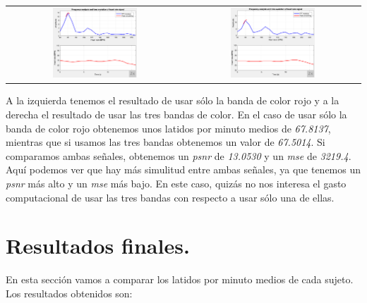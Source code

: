 \documentclass[11pt]{article}
\begin{document}
\begin{table}[H]
	\centering
	\begin{tabular}{cc}
		\includegraphics[width=0.5\textwidth]{images/sujeto5_R.png} & \includegraphics[width=0.5\textwidth]{images/sujeto5_RGB.png}
	\end{tabular}
\end{table}

A la izquierda tenemos el resultado de usar sólo la banda de color rojo y a la derecha el resultado de usar las tres bandas de color. En el caso de usar sólo la banda de color rojo obtenemos unos latidos por minuto medios de \textit{67.8137}, mientras que si usamos las tres bandas obtenemos un valor de \textit{67.5014}. Si comparamos ambas señales, obtenemos un \textit{psnr} de \textit{13.0530} y un \textit{mse} de \textit{3219.4}. Aquí podemos ver que hay más simulitud entre ambas señales, ya que tenemos un \textit{psnr} más alto y un \textit{mse} más bajo. En este caso, quizás no nos interesa el gasto computacional de usar las tres bandas con respecto a usar sólo una de ellas.

\section{Resultados finales.}

En esta sección vamos a comparar los latidos por minuto medios de cada sujeto. Los resultados obtenidos son:
\end{document}
